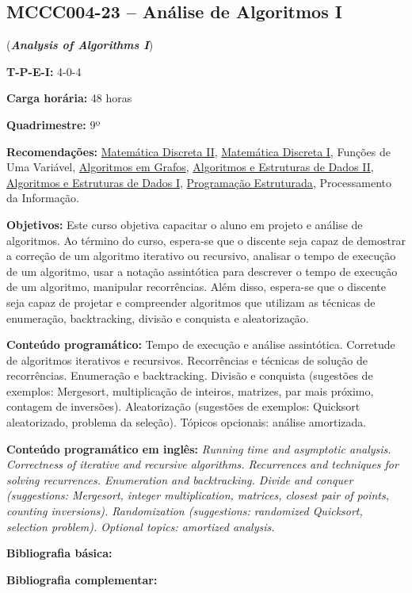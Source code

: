 \documentclass[class=article, crop=false]{standalone}
\begin{document}
\subsection*{MCCC004-23 -- Análise de Algoritmos I}
\label{disc:aaI}

(\textbf{\textit{Analysis of Algorithms I}})

\begin{center}
    \begin{minipage}{0.85\textwidth}
        \textbf{T-P-E-I:} 4-0-4
        
        \textbf{Carga horária:} 48 horas
        
        \textbf{Quadrimestre:} 9º
        
        \textbf{Recomendações:} 
        \hyperref[disc:mdII]{Matemática Discreta II},
        \hyperref[disc:mdI]{Matemática Discreta I},
        Funções de Uma Variável,
        \hyperref[disc:ag]{Algoritmos em Grafos},
        \hyperref[disc:aedII]{Algoritmos e Estruturas de Dados II},
        \hyperref[disc:aedI]{Algoritmos e Estruturas de Dados I},
        \hyperref[disc:pe]{Programação Estruturada},
        Processamento da Informação.
    \end{minipage}
\end{center}

\textbf{Objetivos:}
Este curso objetiva capacitar o aluno em projeto e análise de algoritmos. 
Ao término do curso, espera-se que o discente seja capaz de demostrar a
correção de um algoritmo iterativo ou recursivo, analisar o tempo de execução
de um algoritmo, usar a notação assintótica para descrever o tempo de execução
de um algoritmo, manipular recorrências.
Além disso, espera-se que o discente seja capaz de projetar e compreender
algoritmos que utilizam as técnicas de enumeração, backtracking, divisão e
conquista e aleatorização.


\textbf{Conteúdo programático:}
Tempo de execução e análise assintótica.
Corretude de algoritmos iterativos e recursivos.
Recorrências e técnicas de solução de recorrências.
Enumeração e backtracking.
Divisão e conquista (sugestões de exemplos: Mergesort, multiplicação de
inteiros, matrizes, par mais próximo, contagem de inversões).
Aleatorização (sugestões de exemplos: Quicksort aleatorizado, problema da seleção). 
Tópicos opcionais: análise amortizada.

\textbf{Conteúdo programático em inglês:}
\textit{Running time and asymptotic analysis.
Correctness of iterative and recursive algorithms.
Recurrences and techniques for solving recurrences.
Enumeration and backtracking.
Divide and conquer (suggestions: Mergesort, integer multiplication, matrices, closest pair of points, counting inversions).
Randomization (suggestions: randomized Quicksort, selection problem).
Optional topics: amortized analysis.}

\newrefsection
\textbf{Bibliografia básica:}
\nocite{2012-cormen-etal, 2008-dasgupta-etal, 1998-sedgewick}
\printbibliography

\newrefsection
\textbf{Bibliografia complementar:}
\nocite{2011-sedgewick-wayne, 2006-kleinberg-tardos, 1989-manber}
\printbibliography
\end{document}

